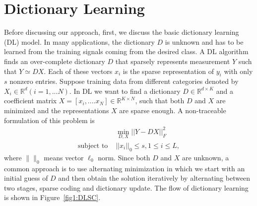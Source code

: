 \section{Dictionary Learning}
Before discussing our approach, first, we discuss the basic dictionary learning (DL) model.
In many applications, the dictionary $D$ is unknown and has to be learned from the training signals coming from the desired class. A DL algorithm finds an over-complete dictionary $D$ that sparsely represents measurement $Y$ such that $Y \simeq DX$. Each of these vectors $ x_i$ is the sparse representation of $y_i$ with only $s$ nonzero entries.
Suppose training data from different categories denoted by $X_i \in \mathbb{R}^d(i=1,...N)$. In DL we want to find a dictionary $D \in \mathbb{R}^{d \times K} $ and a coefficient matrix 
$X = [x_i,.... x_N] \in \mathbb{R}^{K \times N}$, such that both $D$ and $X$ are minimized and the representations $X$ are sparse enough. A non-traceable formulation of this problem is 
\begin{equation}
\begin{aligned}
& \underset{D,X} \min ||Y-DX||_F^2 \\
\text{subject to } &  ||x_i||_0 \leqslant s, 1 \leqslant i \leqslant L,
\end{aligned}
\label{eq:DL1}
\end{equation}
\noindent
where $\|\|_0$ means vector $\ell_0$ norm.
Since both $D$ and $X$ are unknown, a common approach is to use alternating minimization in which we start with an initial guess of $D$ and then obtain the solution iteratively by alternating between two stages, sparse coding and dictionary update. The flow of dictionary learning is shown in Figure~\ref{fig1:DLSC}.
